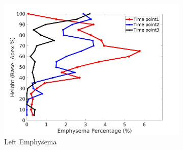 \begin{figure}[H]
\begin{subfigure}{.42\linewidth}
  \includegraphics[width=\linewidth,trim={{.0\wd0} {.0\wd0} {.0\wd0} {.0\wd0}},clip]{Appendix/Image_AppexA/BaseToApex/IPF6LeftLungEmphysemaDiseaseAgainstHeight.jpg} %
  \caption{Left Emphysema}
  \label{fig:IPF6DiseaseAgainstHeight-g} 
\end{subfigure} 
\begin{subfigure}{.42\linewidth}%

\end{subfigure}
\end{figure}
